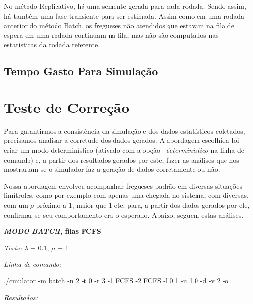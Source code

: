\documentclass[a4paper,10pt]{article}
\begin{document}
    No método Replicativo, há uma semente gerada para cada rodada. Sendo assim, há também uma fase transiente para ser estimada. Assim como em uma rodada anterior do método Batch, os fregueses não atendidos que estavam na fila de espera em uma rodada continuam na fila, mas não são computados nas estatísticas da rodada referente.


\subsection{Tempo Gasto Para Simulação}

\pagebreak

\section{Teste de Correção}

    Para garantirmos a consistência da simulação e dos dados estatísticos coletados, precisamos analisar a corretude dos dados gerados. A abordagem escolhida foi criar um modo determinístico (ativado com a opção \emph{--deterministico} na linha de comando) e, a partir dos resultados gerados por este, fazer as análises que nos mostrariam se o simulador faz a geração de dados corretamente ou não.

    Nossa abordagem envolveu acompanhar fregueses-padrão em diversas situações limítrofes, como por exemplo com apenas uma chegada no sistema, com diversas, com um $\rho$ próximo a 1, maior que 1 etc. para, a partir dos dados gerados por ele, confirmar se seu comportamento era o esperado. Abaixo, seguem estas análises.

\textbf{\emph{MODO BATCH}, filas FCFS}

\emph{Teste:} $\lambda$ = 0.1, $\mu$ = 1

\emph{Linha de comando:}

./cmulator -m batch -n 2 -t 0 -r 3 -1 FCFS -2 FCFS -l 0.1 -u 1.0 -d -v 2 -o

\emph{Resultados:}
\end{document}
